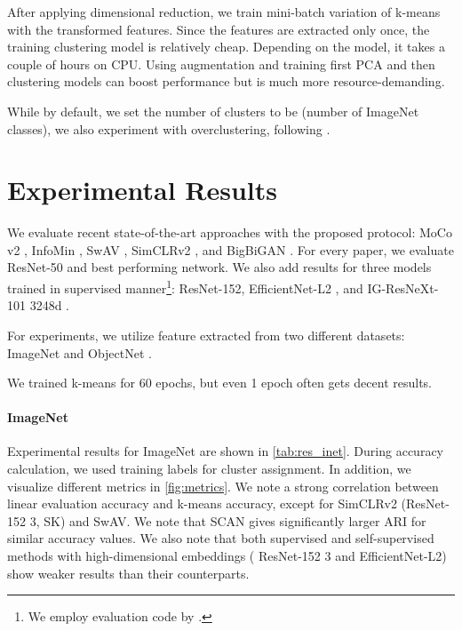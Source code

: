 \documentclass[runningheads]{llncs}
\renewcommand{\cite}[1]{\citep{#1}}
\begin{document}
After applying dimensional reduction, we train mini-batch variation of k-means with the transformed features. Since the features are extracted only once, the training clustering model is relatively cheap. Depending on the model, it takes a couple of hours on CPU.  Using augmentation and training first PCA and then clustering models can boost performance but is much more resource-demanding.


While by default, we set the number of clusters to be  (number of ImageNet classes), we also experiment with overclustering, following \citet{gansbeke2020scan}. \section{Experimental Results}
\label{sec:exp}

We evaluate recent state-of-the-art approaches with the proposed protocol: MoCo v2 \cite{chen2020moco2}, InfoMin \cite{tian2020infomin}, SwAV \cite{caron2020swav}, SimCLRv2 \cite{chen2020simclr2}, and BigBiGAN \cite{donahue2019bigbigan}. 
For every paper, we evaluate ResNet-50 and best performing network. 
We also add results for three models trained in supervised manner\footnote{We employ evaluation code by \citet{wightman2020models}.}: ResNet-152,  EfficientNet-L2 \cite{xie2019noisystudent}, and IG-ResNeXt-101 3248d 
 \cite{mahajan2018weaklyig}. 



For experiments, we utilize feature extracted from two different datasets: ImageNet and ObjectNet \cite{barbu2019objectnet}. 


We trained k-means for 60 epochs, but even 1 epoch often gets decent results.

\paragraph{ImageNet}
Experimental results for ImageNet are shown in \cref{tab:res_inet}. During accuracy calculation, we used training labels for cluster assignment. In addition, we visualize different metrics in \cref{fig:metrics}. We note a strong correlation between linear evaluation accuracy and k-means accuracy, except for SimCLRv2 (ResNet-152 3, SK) and SwAV. We note that SCAN \cite{gansbeke2020scan} gives significantly larger ARI for similar accuracy values. We also note that both supervised and self-supervised methods with high-dimensional embeddings ( ResNet-152 3 and EfficientNet-L2) show weaker results than their counterparts.
\end{document}
